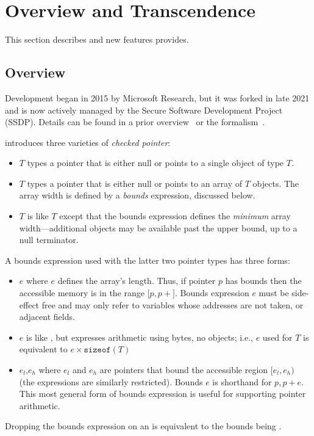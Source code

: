 \section{Overview and Transcendence}\label{sec:overview}

This section describes \checkedc and new features \systemname provides.


\subsection{\checkedc Overview}

\checkedc Development began in 2015 by Microsoft Research, but it was forked
in late 2021 and is now actively managed by the Secure Software
Development Project (SSDP). Details can be found in a prior
overview~\cite{Elliott2018} or the formalism~\cite{li22checkedc}.

\checkedc introduces three varieties of \emph{checked pointer}:
\begin{itemize}
\item {}$T$\code{>} types a pointer that is either null or
  points to a single object of type $T$.
\item {}$T$\code{>} types a pointer that is either null
  or points to an array of $T$ objects. The array width is defined
  by a \emph{bounds} expression, discussed below.
\item {}$T$\code{>} is like
  $T$\code{>} except that the bounds expression
  defines the \emph{minimum} array width---additional objects may
  be available past the upper bound, up to a null terminator.
\end{itemize}
A bounds expression used with the latter two pointer types has three
forms:
\begin{itemize}
\item {}$e$\code{)} where $e$ defines the array's
  length. Thus, if pointer $p$ has bounds  then the
  accessible memory is in the range $[p,p+$$]$. Bounds
  expression $e$ must be side-effect free and may only refer to
  variables whose addresses are not taken, or adjacent 
  fields.
\item {}$e$\code{)} is like , but
  expresses arithmetic using bytes, no objects; i.e.,
  $e$\code{)} used for $T$\code{>} is
  equivalent to $e\times\texttt{sizeof}(T)$\code{)}
\item {}$e_l$,$e_h$\code{)} where $e_l$ and $e_h$ are
  pointers that bound the accessible region $[e_l,e_h)$ (the
  expressions are similarly restricted). Bounds
  $e$\code{)} is shorthand for
  $p, p + e$\code{)}. This most general form of bounds
  expression is useful for supporting pointer arithmetic.
\end{itemize}
  Dropping the bounds expression on an  is equivalent
  to the bounds being .

